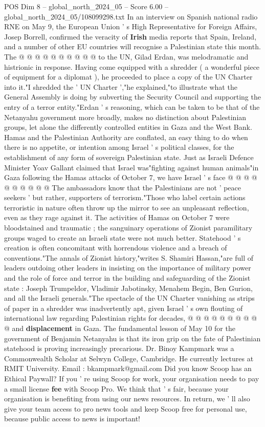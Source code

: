 \begin{textsample}{POS Dim 8 – global\_north\_2024\_05 – Score 6.00 – global\_north\_2024\_05/108099298.txt}
In an interview on Spanish national radio RNE on May 9, the European Union ' s High Representative for Foreign Affairs, Josep Borrell, confirmed the veracity of \textbf{Irish} media reports that Spain, Ireland, and a number of other EU countries will recognise a Palestinian state this month.
The @ @ @ @ @ @ @ @ @ @ to the UN, Gilad Erdan, was melodramatic and histrionic in response.
Having come equipped with a shredder ( a wonderful piece of equipment for a diplomat ), he proceeded to place a copy of the UN Charter into it."I shredded the ' UN Charter ',"he explained,"to illustrate what the General Assembly is doing by subverting the Security Council and supporting the entry of a terror entity."Erdan ' s reasoning, which can be taken to be that of the Netanyahu government more broadly, makes no distinction about Palestinian groups, let alone the differently controlled entities in Gaza and the West Bank.
Hamas and the Palestinian Authority are conflated, an easy thing to do when there is no appetite, or intention among Israel ' s political classes, for the establishment of any form of sovereign Palestinian state.
Just as Israeli Defence Minister Yoav Gallant claimed that Israel was"fighting against human animals"in Gaza following the Hamas attacks of October 7, we have Israel ' s face @ @ @ @ @ @ @ @ @ @ The ambassadors know that the Palestinians are not ' peace seekers ' but rather, supporters of terrorism."Those who label certain actions terroristic in nature often throw up the mirror to see an unpleasant reflection, even as they rage against it.
The activities of Hamas on October 7 were bloodstained and traumatic ; the sanguinary operations of Zionist paramilitary groups waged to create an Israeli state were not much better.
Statehood ' s creation is often concomitant with horrendous violence and a breach of conventions."The annals of Zionist history,"writes S.
Shamiri Hassan,"are full of leaders outdoing other leaders in insisting on the importance of military power and the role of force and terror in the building and safeguarding of the Zionist state : Joseph Trumpeldor, Vladimir Jabotinsky, Menahem Begin, Ben Gurion, and all the Israeli generals."The spectacle of the UN Charter vanishing as strips of paper in a shredder was inadvertently apt, given Israel ' s own flouting of international law regarding Palestinian rights for decades, @ @ @ @ @ @ @ @ @ @ and \textbf{displacement} in Gaza.
The fundamental lesson of May 10 for the government of Benjamin Netanyahu is that its iron grip on the fate of Palestinian statehood is proving increasingly precarious.
Dr.
Binoy Kampmark was a Commonwealth Scholar at Selwyn College, Cambridge.
He currently lectures at RMIT University.
Email : bkampmark@gmail.com Did you know Scoop has an Ethical Paywall?
If you ' re using Scoop for work, your organisation needs to pay a small license \textbf{fee} with Scoop Pro.
We think that ' s fair, because your organisation is benefiting from using our news resources.
In return, we ' ll also give your team access to pro news tools and keep Scoop free for personal use, because public access to news is important!

\end{textsample}
